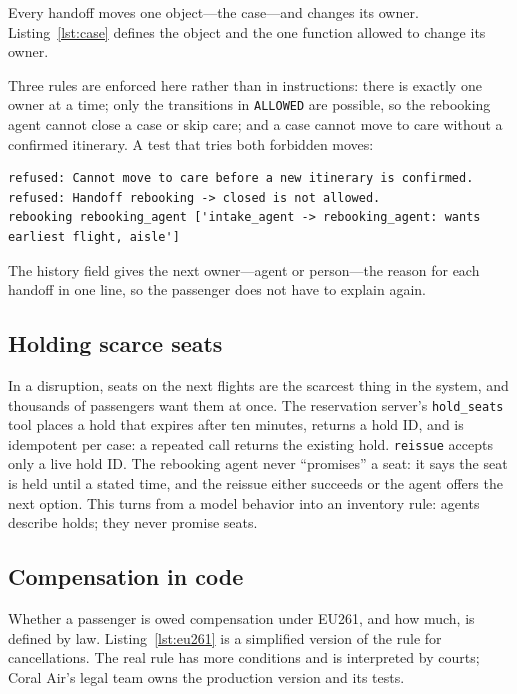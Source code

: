 Every handoff moves one object---the case---and changes its owner. Listing~\ref{lst:case} defines the object and the one function allowed to change its owner.



Three rules are enforced here rather than in instructions: there is exactly one owner at a time; only the transitions in \texttt{ALLOWED} are possible, so the rebooking agent cannot close a case or skip care; and a case cannot move to care without a confirmed itinerary. A test that tries both forbidden moves:
\begin{lstlisting}[language={}, numbers=none, frame=none, xleftmargin=1.5em]
refused: Cannot move to care before a new itinerary is confirmed.
refused: Handoff rebooking -> closed is not allowed.
rebooking rebooking_agent ['intake_agent -> rebooking_agent: wants earliest flight, aisle']
\end{lstlisting}
The history field gives the next owner---agent or person---the reason for each handoff in one line, so the passenger does not have to explain again.

\subsection{Holding scarce seats}

In a disruption, seats on the next flights are the scarcest thing in the system, and thousands of passengers want them at once. The reservation server's \texttt{hold\_seats} tool places a hold that expires after ten minutes, returns a hold ID, and is idempotent per case: a repeated call returns the existing hold. \texttt{reissue} accepts only a live hold ID. The rebooking agent never ``promises'' a seat: it says the seat is held until a stated time, and the reissue either succeeds or the agent offers the next option. This turns  from a model behavior into an inventory rule: agents describe holds; they never promise seats.

\subsection{Compensation in code}

Whether a passenger is owed compensation under EU261, and how much, is defined by law. Listing~\ref{lst:eu261} is a simplified version of the rule for cancellations. The real rule has more conditions and is interpreted by courts; Coral Air's legal team owns the production version and its tests.

